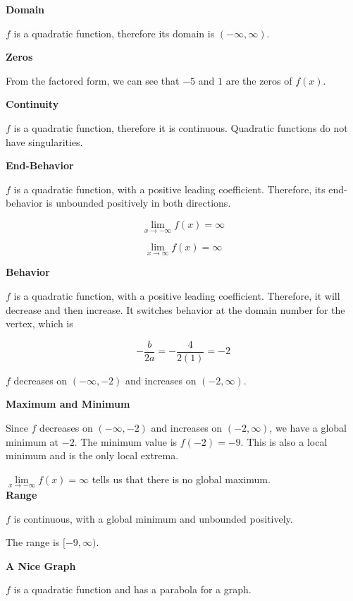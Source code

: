 \documentclass{ximera}
\begin{document}
\begin{example}
\textbf{Domain}

$f$ is a quadratic function, therefore its domain is $(-\infty, \infty)$. 



\textbf{Zeros}

From the factored form, we can see that $-5$ and $1$ are the zeros of $f(x)$.  


\textbf{Continuity}

$f$ is a quadratic function, therefore it is continuous. Quadratic functions do not have singularities.



\textbf{End-Behavior}

$f$ is a quadratic function, with a positive leading coefficient. Therefore, its end-behavior is unbounded positively in both directions. 

\[
\lim\limits_{x \to -\infty} f(x) = \infty 
\]


\[
\lim\limits_{x \to \infty} f(x) = \infty 
\]




\textbf{Behavior}

$f$ is a quadratic function, with a positive leading coefficient. Therefore, it will decrease and then increase. It switches behavior at the domain number for the vertex, which is


\[
-\frac{b}{2a} = -\frac{4}{2(1)} = -2
\]


$f$ decreases on $(-\infty, -2)$ and increases on $(-2, \infty )$. 




\textbf{Maximum and Minimum}


Since $f$ decreases on $(-\infty, -2)$ and increases on $(-2, \infty )$, we have a global minimum at $-2$.   The minimum value is $f(-2) = -9$. This is also a local minimum and is the only local extrema.


$\lim\limits_{x \to -\infty} f(x) = \infty$ tells us that there is no global maximum. \\




\textbf{Range}

$f$ is continuous, with a global minimum and unbounded positively. 

The range is $[-9, \infty)$. 



\textbf{\textcolor{purple!85!blue}{A Nice Graph}}

$f$ is a quadratic function and has a parabola for a graph.



\end{example}
\end{document}
